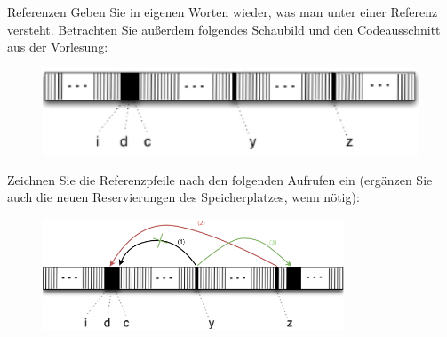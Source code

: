 \documentclass{../preamble}
\date{23.11.2020 - 27.11.2020}
\begin{document}
\maketitle

\makedisclaimer

\clearpage

\begin{task}[credit = \stars{0}{3}]{Referenzen}
    Geben Sie in eigenen Worten wieder, was man unter einer Referenz versteht.
    \br
    Betrachten Sie außerdem folgendes Schaubild und den Codeausschnitt aus der Vorlesung:

    \begin{minipage}{0.45\textwidth}
        \begin{figure}[H]
            \includegraphics[width = 1\textwidth]{graphics/V1_Task.png}
        \end{figure}
    \end{minipage}
    \hfill
    \begin{minipage}{0.45\textwidth}
        
    \end{minipage}
    Zeichnen Sie die Referenzpfeile nach den folgenden Aufrufen ein (ergänzen Sie auch die neuen Reservierungen des Speicherplatzes, wenn nötig):
    

    \begin{solution}
        \begin{figure}[h]
            \centering
            \includegraphics[width = 0.8\textwidth]{graphics/V1_Solution.png}
        \end{figure}
    \end{solution}
\end{task}
\end{document}
